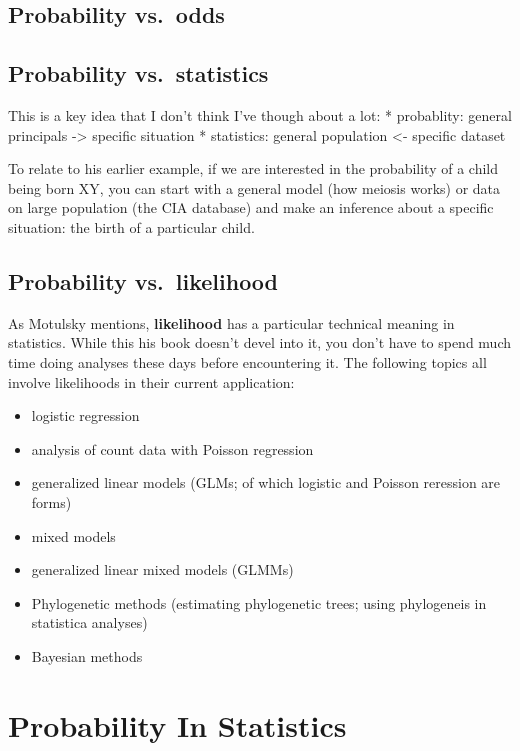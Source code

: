 \documentclass[]{book}
\providecommand{\tightlist}{%
  \setlength{\itemsep}{0pt}\setlength{\parskip}{0pt}}
\theoremstyle{definition}
\theoremstyle{definition}
\theoremstyle{definition}
\theoremstyle{remark}
\begin{document}
\subsection{Probability vs.~odds}\label{probability-vs.odds}

\subsection{Probability vs.~statistics}\label{probability-vs.statistics}

This is a key idea that I don't think I've though about a lot: *
probablity: general principals -\textgreater{} specific situation *
statistics: general population \textless{}- specific dataset

To relate to his earlier example, if we are interested in the
probability of a child being born XY, you can start with a general model
(how meiosis works) or data on large population (the CIA database) and
make an inference about a specific situation: the birth of a particular
child.

\subsection{Probability vs.~likelihood}\label{probability-vs.likelihood}

As Motulsky mentions, \textbf{likelihood} has a particular technical
meaning in statistics. While this his book doesn't devel into it, you
don't have to spend much time doing analyses these days before
encountering it. The following topics all involve likelihoods in their
current application:

\begin{itemize}
\tightlist
\item
  logistic regression
\item
  analysis of count data with Poisson regression
\item
  generalized linear models (GLMs; of which logistic and Poisson
  reression are forms)
\item
  mixed models
\item
  generalized linear mixed models (GLMMs)
\item
  Phylogenetic methods (estimating phylogenetic trees; using phylogeneis
  in statistica analyses)
\item
  Bayesian methods
\end{itemize}

\section{Probability In Statistics}\label{probability-in-statistics}
\end{document}
